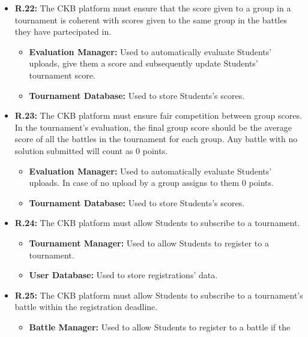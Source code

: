 \documentclass{article}
\begin{document}
{\begin{itemize}
\begin{itemize}
              \item \textbf{Tournament Manager:} Used to retrieve battle's data. 
          \end{itemize}
    \item \textbf{R.22:} The CKB platform must ensure that the score given to a group in a tournament is
          coherent with scores given to the same group in the battles they have partecipated in.
          \begin{itemize}
              \item \textbf{Evaluation Manager:} Used to automatically evaluate Students' uploads,
              give them a score and subsequently update Students' tournament score.
              \item \textbf{Tournament Database:} Used to store Students's scores.
          \end{itemize}
    \item \textbf{R.23:} The CKB platform must ensure fair competition between group scores. In the tournament's evaluation, the final
          group score should be the average score of all the battles in the tournament for each group. Any battle with no solution submitted will count
          as 0 points.
          \begin{itemize}
            \item \textbf{Evaluation Manager:} Used to automatically evaluate Students' uploads.
            In case of no upload by a group assigns to them 0 points.
            \item \textbf{Tournament Database:} Used to store Students's scores.
          \end{itemize}
    \item \textbf{R.24:} The CKB platform must allow Students to subscribe to a tournament.
          \begin{itemize}
              \item \textbf{Tournament Manager:} Used to allow Students to register to a tournament.
              \item \textbf{User Database:} Used to store registrations' data.
          \end{itemize}
    \item \textbf{R.25:} The CKB platform must allow Students to subscribe to a tournament's battle
          within the registration deadline.
          \begin{itemize}
              \item \textbf{Battle Manager:} Used to allow Students to register to a battle if the

\end{itemize}
\end{itemize}}
\end{document}

